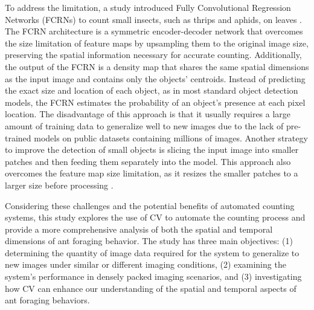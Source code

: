 To address the limitation, a study introduced Fully Convolutional Regression Networks (FCRNs) to count small insects, such as thrips and aphids, on leaves \cite{BereciartuaPerez2023Multiclass}. The FCRN architecture is a symmetric encoder-decoder network that overcomes the size limitation of feature maps by upsampling them to the original image size, preserving the spatial information necessary for accurate counting. Additionally, the output of the FCRN is a density map that shares the same spatial dimensions as the input image and contains only the objects’ centroids. Instead of predicting the exact size and location of each object, as in most standard object detection models, the FCRN estimates the probability of an object’s presence at each pixel location. The disadvantage of this approach is that it usually requires a large amount of training data to generalize well to new images due to the lack of pre-trained models on public datasets containing millions of images. Another strategy to improve the detection of small objects is slicing the input image into smaller patches and then feeding them separately into the model. This approach also overcomes the feature map size limitation, as it resizes the smaller patches to a larger size before processing \cite{Hong2021Automatic,BereciartuaPerez2023Multiclass}. 
    
Considering these challenges and the potential benefits of automated counting systems, this study explores the use of CV to automate the counting process and provide a more comprehensive analysis of both the spatial and temporal dimensions of ant foraging behavior. The study has three main objectives: (1) determining the quantity of image data required for the system to generalize to new images under similar or different imaging conditions, (2) examining the system’s performance in densely packed imaging scenarios, and (3) investigating how CV can enhance our understanding of the spatial and temporal aspects of ant foraging behaviors.
